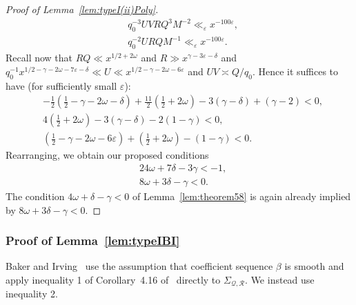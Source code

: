 \documentclass{amsart}
\numberwithin{equation}{section}
\begin{document}
\begin{proof}[Proof of Lemma~\ref{lem:typeI(ii)Poly}]
\begin{align*}
 &  q_0^{-3} UV  R Q^3   M^{-2} \ll_\varepsilon x^{-100\varepsilon}, \\
 &  q_0^{-2}U  RQ  M^{-1}\ll_\varepsilon x^{-100\varepsilon}.
 \end{align*}
Recall now that $RQ \ll x^{1/2+2\omega}$ and $R \gg x^{\gamma -3\varepsilon-\delta}$  and $q_0^{-1} x^{1/2 -\gamma-2\omega -7 \varepsilon-\delta }  \ll U \ll x^{1/2-\gamma-2\omega  -6\varepsilon}$ and $UV \asymp Q/q_0$.  Hence it suffices to have (for  sufficiently small $\varepsilon$):
  \begin{align*}
   & - \tfrac{1}{2}(\tfrac{1}{2} -\gamma -2 \omega -\delta)   +\tfrac{11}{2} (\tfrac{1}{2}+2\omega)-3(\gamma-\delta) + (\gamma -2)  <0,  \\     
 &    4 (\tfrac{1}{2} + 2\omega) -3(\gamma-\delta)-2(1- \gamma) <0, \\
 & (\tfrac{1}{2}-\gamma -2\omega - 6\varepsilon)+  (\tfrac{1}{2}+2\omega)- (1-\gamma) <0.
 \end{align*}
 Rearranging, we obtain our proposed conditions
 \begin{align*}
  &          24\omega +7\delta  -3\gamma  <-1,  \\     
 &        8\omega+3\delta -  \gamma    <0.
 \end{align*} 
  The  condition $ 4\omega +\delta  -\gamma<0$ of Lemma~\ref{lem:theorem58} is again already implied by $8\omega + 3\delta -\gamma <0$.
\end{proof}

\subsubsection{Proof of Lemma~\ref{lem:typeIBI}}  Baker and Irving~\cite{Baker:2017:BIP} use the assumption that coefficient sequence $\beta$ is smooth and  apply inequality 1 of Corollary~4.16 of~\cite{Polymath:2014:EDZ} directly to $\Sigma_{\mathcal{Q},\mathcal{R}}$. We instead use inequality 2. 
\end{document}
